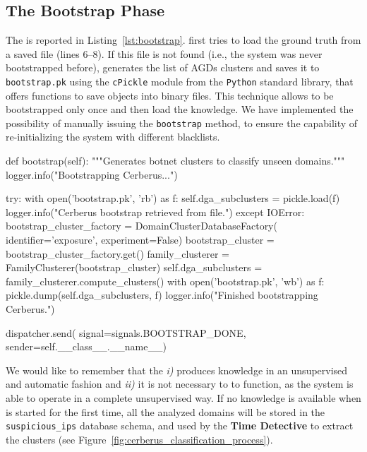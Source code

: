 \subsection{The Bootstrap Phase} %
\label{sub:the_bootstrap_phase}
The  is reported in Listing~\ref{lst:bootstrap}.
\thesystem first tries to load the ground truth from a saved file
(lines 6--8). If this file is not found (i.e., the system was never
bootstrapped before), \thesystem generates the list of AGDs clusters and
saves it to \texttt{bootstrap.pk} using the \texttt{cPickle} module
from the \texttt{Python} standard library, that offers functions to save
objects into binary files. This technique allows \thesystem to be
bootstrapped only once and then load the knowledge. We have implemented the
possibility of manually issuing the \texttt{bootstrap} method, to ensure
the capability of re-initializing the system with different blacklists.
\begin{pyglist}[language=python,caption={bootstrap function implementation.}, label=lst:bootstrap]
def bootstrap(self):
        """Generates botnet clusters to classify unseen domains."""
        logger.info("Bootstrapping Cerberus...")

        try:
            with open('bootstrap.pk', 'rb') as f:
                self.dga_subclusters = pickle.load(f)
                logger.info("Cerberus bootstrap retrieved from file.")
        except IOError:
            bootstrap_cluster_factory = DomainClusterDatabaseFactory(
                identifier='exposure',
                experiment=False)
            bootstrap_cluster = bootstrap_cluster_factory.get()
            family_clusterer = FamilyClusterer(bootstrap_cluster)
            self.dga_subclusters = family_clusterer.compute_clusters()
            with open('bootstrap.pk', 'wb') as f:
                pickle.dump(self.dga_subclusters, f)
            logger.info("Finished bootstrapping Cerberus.")

        dispatcher.send(
            signal=signals.BOOTSTRAP_DONE,
            sender=self.__class__.__name__)
\end{pyglist}
We would like to remember that the  \emph{i)} produces
knowledge in an unsupervised and automatic fashion and \emph{ii)} it is not
necessary to \thesystem to function, as the system is able to operate in a
complete unsupervised way. If no knowledge is available when \thesystem is
started for the first time, all the analyzed domains will be stored in the
\texttt{suspicious\_ips} database schema, and used by the \textbf{Time Detective}
to extract the clusters (see Figure~\ref{fig:cerberus_classification_process}).

